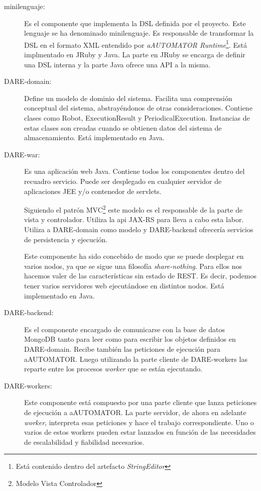 \begin{description}

\item[minilenguaje:] Es el componente que implementa la DSL definida
  por el proyecto. Este lenguaje se ha denominado minilenguaje. Es
  responsable de transformar la DSL en el formato XML entendido por
  \emph{aAUTOMATOR Runtime}\footnote{Está contenido dentro del
    artefacto \emph{StringEditor}}. Está implmentado en JRuby y
  Java. La parte en JRuby se encarga de definir una DSL interna y la
  parte Java ofrece una API a la misma.
\item[DARE-domain:] Define un modelo de dominio del sistema. Facilita
  una comprensión conceptual del sistema, abstrayéndonos de otras
  consideraciones. Contiene clases como Robot, ExecutionResult y
  PeriodicalExecution. Instancias de estas clases son creadas cuando
  se obtienen datos del sistema de almacenamiento. Está implementado
  en Java.
\item[DARE-war:] Es una aplicación web Java. Contiene todos los
  componentes dentro del recuadro servicio. Puede ser desplegado en
  cualquier servidor de aplicaciones JEE y/o contenedor de servlets.

  Siguiendo el patrón MVC\footnote{Modelo Vista Controlador} este
  modelo es el responsable de la parte de vista y controlador. Utiliza
  la api JAX-RS para lleva a cabo esta labor. Utiliza a DARE-domain
  como modelo y DARE-backend ofrecería servicios de persistencia y
  ejecución.

  Este componente ha sido concebido de modo que se puede desplegar en
  varios nodos, ya que se sigue una filosofía
  \emph{share-nothing}. Para ellos nos hacemos valer de las
  características sin estado de REST. Es decir, podemos tener varios
  servidores web ejecutándose en distintos nodos. Está implementado en
  Java.

\item[DARE-backend:] Es el componente encargado de comunicarse con la
  base de datos MongoDB tanto para leer como para escribir los objetos
  definidos en DARE-domain. Recibe también las peticiones de ejecución
  para aAUTOMATOR. Luego utilizando la parte cliente de DARE-workers
  las reparte entre los procesos \emph{worker} que se están
  ejecutando.

\item[DARE-workers:] Este componente está compuesto por una parte
  cliente que lanza peticiones de ejecución a aAUTOMATOR. La parte
  servidor, de ahora en adelante \emph{worker}, interpreta esas
  peticiones y hace el trabajo correspondiente. Uno o varios de estos
  workers pueden estar lanzados en función de las necesidades de
  escalabilidad y fiabilidad necesarios.


\end{description}
